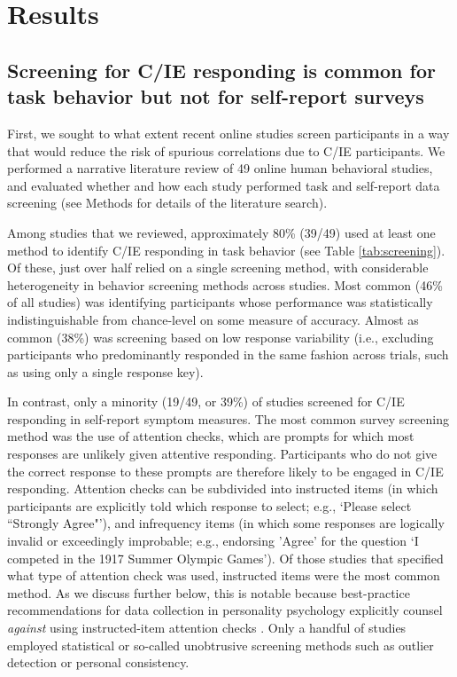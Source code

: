 \documentclass[a4paper,notitlepage,12pt]{article}
\begin{document}
\section{Results}

\subsection{Screening for C/IE responding is common for task behavior but not for self-report surveys}

First, we sought to what extent recent online studies screen participants in a way that would reduce the risk of spurious correlations due to C/IE participants. We performed a narrative literature review of 49 online human behavioral studies, and evaluated whether and how each study performed task and self-report data screening (see Methods for details of the literature search).

Among studies that we reviewed, approximately 80\% (39/49) used at least one method to identify C/IE responding in task behavior (see Table \ref{tab:screening}). Of these, just over half relied on a single screening method, with considerable heterogeneity in behavior screening methods across studies. Most common (46\% of all studies) was identifying participants whose performance was statistically indistinguishable from chance-level on some measure of accuracy. Almost as common (38\%) was screening based on low response variability (i.e., excluding participants who predominantly responded in the same fashion across trials, such as using only a single response key).

In contrast, only a minority (19/49, or 39\%) of studies screened for C/IE responding in self-report symptom measures. The most common survey screening method was the use of attention checks, which are prompts for which most responses are unlikely given attentive responding. Participants who do not give the correct response to these prompts are therefore likely to be engaged in C/IE responding. Attention checks can be subdivided into instructed items (in which participants are explicitly told which response to select; e.g., `Please select ``Strongly Agree"'), and infrequency items (in which some responses are logically invalid or exceedingly improbable; e.g., endorsing 'Agree' for the question `I competed in the 1917 Summer Olympic Games'). Of those studies that specified what type of attention check was used, instructed items were the most common method. As we discuss further below, this is notable because best-practice recommendations for data collection in personality psychology explicitly counsel \emph{against} using instructed-item attention checks \cite{barends2019noncompliant, thomas2017validity, hauser2016attentive}. Only a handful of studies employed statistical or so-called unobtrusive screening methods such as outlier detection or personal consistency. 
\end{document}
